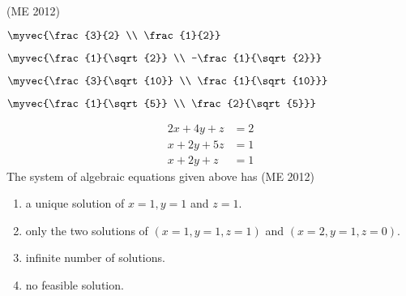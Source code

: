 	    \hfill (ME 2012)
          \begin{enumerate}
              \begin{multicols}{4}
                  \item \(\myvec{\frac{3}{2} \\ \frac{1}{2}}\)
                  \item \(\myvec{\frac{1}{\sqrt{2}} \\ -\frac{1}{\sqrt{2}}}\)
                  \item \(\myvec{\frac{3}{\sqrt{10}} \\ \frac{1}{\sqrt{10}}}\)
                  \item \(\myvec{\frac{1}{\sqrt{5}} \\ \frac{2}{\sqrt{5}}}\)
              \end{multicols}
          \end{enumerate}
    \item
          \begin{align*}
              2x + 4y + z & = 2 \\
              x + 2y + 5z & = 1 \\
              x + 2y + z  & = 1
          \end{align*}
          The system of algebraic equations given above has
	    \hfill (ME 2012)
          \begin{enumerate}
              \item a unique solution of $x = 1, y = 1$ and $z = 1$.
              \item only the two solutions of $(x = 1, y = 1, z = 1)$ and $(x = 2, y = 1, z = 0)$.
              \item infinite number of solutions.
              \item no feasible solution.
          \end{enumerate}


